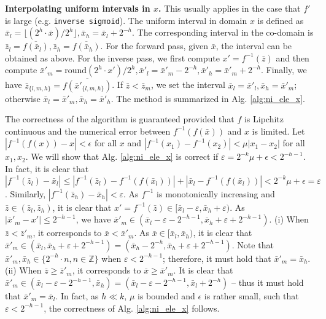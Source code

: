 \documentclass{article}
\newcommand{\quant}[1]{\bar{#1}}
\begin{document}
\textbf{Interpolating uniform intervals in $x$.}
This usually applies in the case that $f'$ is large (e.g. \texttt{inverse sigmoid}). The uniform interval in domain $x$ is defined as $\quant{x}_l = \lfloor (2^h \cdot \quant{x}) / 2^h \rfloor, \quant{x}_h = \quant{x}_l + 2^{-h}$. The corresponding interval in the co-domain is $\quant{z}_l = \overline{f(\quant{x}_l)}, \quant{z}_h = \overline{f(\quant{x}_h)}$. For the forward pass, given $\quant{x}$, the interval can be obtained as above. For the inverse pass, we first compute $x' = f^{-1} (\quant{z})$ and then compute $\quant{x}'_m = \mathrm{round}(2^h \cdot x') / 2^h, \quant{x}'_l = \quant{x}'_m - 2^{-h}, \quant{x}'_h = \quant{x}'_m + 2^{-h}$. Finally, we have $\quant{z}_{\{l,m,h\}} = \overline{f(\quant{x}'_{\{l,m,h\}})}$. If $\quant{z} < \quant{z}_m$, we set the interval $\quant{x}_l =  \quant{x}'_l, \quant{x}_h = \quant{x}'_m$; otherwise $\quant{x}_l = \quant{x}'_m, \quant{x}_h = \quant{x}'_h$. The method is summarized in Alg. \ref{alg:ni_ele_x}.

The correctness of the algorithm is guaranteed provided that $f$ is Lipchitz continuous and the numerical error between $f^{-1} (f(\quant{x}))$ and $x$ is limited. Let $|f^{-1} (f(x)) - x| < \epsilon$ for all $x$ and $|f^{-1} (x_1) - f^{-1} (x_2)| < \mu |x_1 - x_2|$ for all $x_1, x_2$. We will show that Alg. \ref{alg:ni_ele_x} is correct if $\varepsilon = 2^{-k} \mu + \epsilon < 2^{-h-1}$. In fact, it is clear that $|f^{-1} (\quant{z}_l) - \quant{x}_l| \le |f^{-1} (\quant{z}_l) - f^{-1} (f(\quant{x}_l))| + |\quant{x}_l - f^{-1} (f(\quant{x}_l))| < 2^{-k} \mu + \epsilon = \varepsilon$. Similarly, $|f^{-1} (\quant{z}_h) - \quant{x}_h| < \varepsilon$. As $f^{-1}$ is monotonically increasing and $\quant{z} \in (\quant{z}_l, \quant{z}_h)$, it is clear that $x' = f^{-1} (\quant{z}) \in [\quant{x}_l - \varepsilon, \quant{x}_h + \varepsilon)$. As $|\quant{x}'_m - x'| \le 2^{-h-1}$, we have $\quant{x}'_m \in (\quant{x}_l - \varepsilon - 2^{-h-1}, \quant{x}_h + \varepsilon + 2^{-h-1})$. (i) When $\quant{z} < \quant{z}'_m$, it corresponds to $\quant{x} < \quant{x}'_m$. As $\quant{x} \in [\quant{x}_l, \quant{x}_h)$, it is clear that $\quant{x}'_m \in (\quant{x}_l, \quant{x}_h + \varepsilon + 2^{-h-1}) = (\quant{x}_h - 2^{-h}, \quant{x}_h + \varepsilon + 2^{-h-1})$. Note that $\quant{x}'_m, \quant{x}_h \in \{2^{-h} \cdot n, n \in \mathbb{Z}\}$ when $\varepsilon < 2^{-h-1}$; therefore, it must hold that $\quant{x}'_m = \quant{x}_h$. (ii) When $\quant{z} \ge \quant{z}'_m$, it corresponds to $\quant{x} \ge \quant{x}'_m$. It is clear that $\quant{x}'_m \in (\quant{x}_l - \varepsilon - 2^{-h-1}, \quant{x}_h) = (\quant{x}_l - \varepsilon - 2^{-h-1}, \quant{x}_l + 2^{-h})$ -- thus it must hold that $\quant{x}'_m = \quant{x}_l$. In fact, as $h \ll k$, $\mu$ is bounded and $\epsilon$ is rather small, such that $\varepsilon < 2^{-h-1}$, the correctness of Alg. \ref{alg:ni_ele_x} follows.
\end{document}
